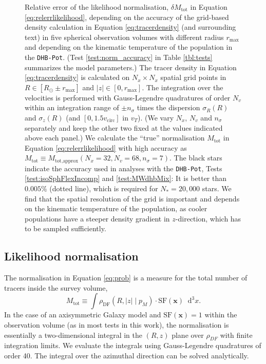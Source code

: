 \documentclass[iop,revtex4,numberedappendix,appendixfloats]{emulateapj}
\newcommand{\vect}[1]{\boldsymbol{#1}}
\newcommand*\Diff[1]{\mathop{}\!\mathrm{d^#1}}
\newcommand{\pmodel}{\ensuremath{p_M}}
\begin{document}

\begin{figure}[!htbp]
\centering
{}
\caption{Relative error of the likelihood normalisation, $\delta M_\text{tot}$ in Equation \eqref{eq:relerrlikelihood}, depending on the accuracy of the grid-based density calculation in Equation \eqref{eq:tracerdensity} (and surrounding text) in five spherical observation volumes with different radius $r_\text{max}$ and depending on the kinematic temperature of the population in the \texttt{DHB-Pot}. (Test \ref{test:norm_accuracy} in Table \ref{tbl:tests} summarizes the model parameters.) The tracer density in Equation \eqref{eq:tracerdensity} is calculated on $N_x\times N_x$ spatial grid points in $R \in [R_\odot \pm r_\text{max}]$ and $|z| \in [0,r_\text{max}]$. The integration over the velocities is performed with Gauss-Legendre quadratures of order $N_v$ within an integration range of $\pm n_\sigma$ times the dispersion $\sigma_R(R)$ and $\sigma_z(R)$ (and $[0,1.5v_\text{circ}]$ in $v_T$). (We vary $N_x$, $N_v$ and $n_\sigma$ separately and keep the other two fixed at the values indicated above each panel.) We calculate the ``true'' normalisation $M_\text{tot}$ in Equation \eqref{eq:relerrlikelihood} with high accuracy as $M_\text{tot} \equiv M_\text{tot,approx}(N_x=32,N_v=68,n_\sigma=7)$. The black stars indicate the accuracy used in analyses with the \texttt{DHB-Pot}, Tests \ref{test:isoSphFlexIncomp} and \ref{test:MWdhbMix}: It is better than $0.005\%$ (dotted line), which is required for $N_*=20,000$ stars. We find that the spatial resolution of the grid is important and depends on the kinematic temperature of the population, as cooler populations have a steeper density gradient in $z$-direction, which has to be sampled sufficiently.}
\label{fig:norm_accuracy}
\end{figure}

\subsection{Likelihood normalisation} \label{sec:likelihood_normalisation}

The normalisation in Equation \eqref{eq:prob} is a measure for the total number of tracers inside the survey volume,
\begin{equation}
M_\text{tot} \equiv \int \rho_\text{DF}(R,|z| \mid \pmodel) \cdot \text{SF}(\vect{x}) \Diff 3 x.\label{eq:normalisation}
\end{equation}
In the case of an axisymmetric Galaxy model and $\text{SF}(\vect{x})=1$ within the observation volume (as in most tests in this work), the normalisation is essentially a two-dimensional integral in the $(R,z)$ plane over $\rho_{DF}$ with finite integration limits. We evaluate the integrals using Gauss-Legendre quadratures of order 40. The integral over the azimuthal direction can be solved analytically. 
\end{document}
